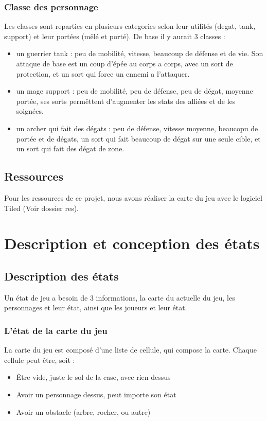 \documentclass[a4paper,12pt]{article}
\begin{document}
\subsubsection{Classe des personnage}

Les classes sont reparties en plusieurs categories selon leur utilités (degat, tank, support) et leur portées (mêlé et porté).
De base il y aurait 3 classes : 

\begin{itemize}
    \item un guerrier tank : peu de mobilité, vitesse, beaucoup de défense et de vie. Son attaque de base est un coup d'épée au corps a corps, avec un sort de protection, et un sort qui force un ennemi a l'attaquer.
    \item un mage support : peu de mobilité, peu de défense, peu de dégat, moyenne portée, ses sorts permêttent d'augmenter les stats des alliées et de les soignées.
    \item un archer qui fait des dégats : peu de défense, vitesse moyenne, beaucopu de portée et de dégats, un sort qui fait beaucoup de dégat sur une seule cible, et un sort qui fait des dégat de zone.
\end{itemize}

\subsection{Ressources}

Pour les ressources de ce projet, nous avons réaliser la carte du jeu avec le logiciel Tiled 
(Voir dossier res).


\clearpage
\section{Description et conception des états}

\subsection{Description des états}

Un état de jeu a besoin de 3 informations, la carte du actuelle du jeu,
les personnages et leur état, ainsi que les joueurs et leur état.

\subsubsection{L'état de la carte du jeu}

La carte du jeu est composé d'une liste de cellule, qui compose la carte.
Chaque cellule peut être, soit :
\begin{itemize}
  \item Être vide, juste le sol de la case, avec rien dessus
  \item Avoir un personnage dessus, peut importe son état
  \item Avoir un obstacle (arbre, rocher, ou autre)
\end{itemize}
\end{document}
